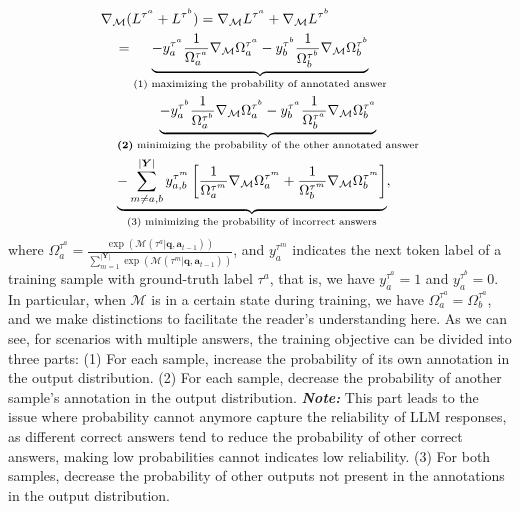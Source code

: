 \begin{equation}
\begin{aligned}
 & \nabla_{\mathcal{M}} (L^{\tau^a} + L^{\tau^b}) = \nabla_{\mathcal{M}} L^{\tau^a} + \nabla_{\mathcal{M}} L^{\tau^b} \\
&\quad= \underbrace{-y_a^{\tau^a}\frac{1}{\Omega_a^{\tau^a}}\nabla_{\mathcal{M}}\Omega_a^{\tau^a}-y_b^{\tau^b}\frac{1}{\Omega_b^{\tau^b}}\nabla_{\mathcal{M}}\Omega_b^{\tau^b}}_{\text{(1) maximizing the probability of annotated answer}}\\& \quad \underbrace{-y_a^{\tau^b}\frac{1}{\Omega_a^{\tau^b}}\nabla_{\mathcal{M}}\Omega_a^{\tau^b}-y_b^{\tau^a}\frac{1}{\Omega_b^{\tau^a}}\nabla_{\mathcal{M}}\Omega_b^{\tau^a}}_{{\text{\textbf{(2)} minimizing the probability of the other annotated answer}}}\\& \quad \underbrace{-\sum_{m \neq a,b}^{|\bm{Y}|}y_{a,b}^{\tau^m} \left[ \frac{1}{\Omega_a^{\tau^m}}\nabla_{\mathcal{M}}\Omega_a^{\tau^m} + \frac{1}{\Omega_b^{\tau^m}}\nabla_{\mathcal{M}}\Omega_b^{\tau^m} \right]}_{\text{(3) minimizing the probability of incorrect answers}},
\end{aligned}\label{eq:competitor}
\end{equation}
where $\Omega_a^{\tau^a}=\frac{\exp(\mathcal{M}(\tau^a|\bm{q},\bm{a}_{t-1}))}{\sum_{m=1}^{|\bm{Y}|} \exp(\mathcal{M}(\tau^{m}|\bm{q},\bm{a}_{t-1}))}$, and $y_a^{\tau^m}$ indicates the next token label of a training sample with ground-truth label ${\tau^a}$, that is, we have $y_a^{\tau^a}=1$ and $y_a^{\tau^b}=0$. In particular, when $\mathcal{M}$ is in a certain state during training, we have $\Omega_a^{\tau^a}=\Omega_b^{\tau^a}$, and we make distinctions to facilitate the reader's understanding here. As we can see, for scenarios with multiple answers, the training objective can be divided into three parts:
(1) For each sample, increase the probability of its own annotation in the output distribution.
(2) For each sample, decrease the probability of another sample's annotation in the output distribution. \textit{\textbf{Note:}} This part leads to the issue where probability cannot anymore capture the reliability of LLM responses, as different correct answers tend to reduce the probability of other correct answers, making low probabilities cannot indicates low reliability.
(3) For both samples, decrease the probability of other outputs not present in the annotations in the output distribution.




